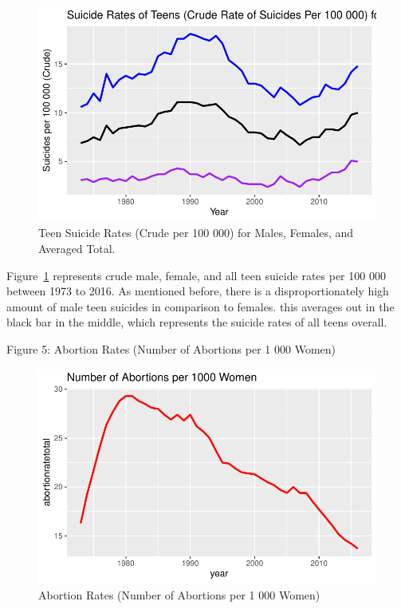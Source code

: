 \documentclass[
  letterpaper,
  DIV=11,
  numbers=noendperiod]{scrartcl}
\begin{document}
\begin{figure}

{\centering \includegraphics{paper_files/figure-pdf/fig-4-1.pdf}

}

\caption{\label{fig-4}Teen Suicide Rates (Crude per 100 000) for Males,
Females, and Averaged Total.}

\end{figure}

Figure~\ref{fig-4} represents crude male, female, and all teen suicide
rates per 100 000 between 1973 to 2016. As mentioned before, there is a
disproportionately high amount of male teen suicides in comparison to
females. this averages out in the black bar in the middle, which
represents the suicide rates of all teens overall.

Figure 5: Abortion Rates (Number of Abortions per 1 000 Women)

\begin{figure}

{\centering \includegraphics{paper_files/figure-pdf/fig-5-1.pdf}

}

\caption{\label{fig-5}Abortion Rates (Number of Abortions per 1 000
Women)}

\end{figure}
\end{document}
